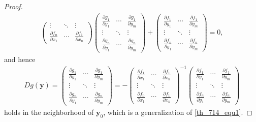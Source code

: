 \documentclass[10pt]{book}
\theoremstyle{definition}
\numberwithin{equation}{chapter}
\begin{document}
\begin{proof}
\begin{align*}
\begin{pmatrix}
        \vdots & \ddots & \vdots \\
        \frac{\partial f_n}{\partial x_1} & \cdots & \frac{\partial f_1}{\partial x_n}
    \end{pmatrix} 
    \begin{pmatrix}
        \frac{\partial g_1}{\partial y_1} & \cdots & \frac{\partial g_1}{\partial y_m} \\
        \vdots & \ddots & \vdots \\
        \frac{\partial g_n}{\partial y_1} & \cdots & \frac{\partial g_n}{\partial y_m}
    \end{pmatrix} + 
    \begin{pmatrix}
        \frac{\partial f_1}{\partial y_1} & \cdots & \frac{\partial f_1}{\partial y_m} \\
        \vdots & \ddots & \vdots \\
        \frac{\partial f_n}{\partial y_1} & \cdots & \frac{\partial f_n}{\partial y_m}
    \end{pmatrix} = 0,
\end{align*}
and hence
\begin{align*}
    Dg(\mathbf{y}) = \begin{pmatrix}
        \frac{\partial g_1}{\partial y_1} & \cdots & \frac{\partial g_1}{\partial y_m} \\
        \vdots & \ddots & \vdots \\
        \frac{\partial g_n}{\partial y_1} & \cdots & \frac{\partial g_n}{\partial y_m}
    \end{pmatrix} = - \begin{pmatrix}
        \frac{\partial f_1}{\partial x_1} & \cdots & \frac{\partial f_1}{\partial x_n} \\
        \vdots & \ddots & \vdots \\
        \frac{\partial f_n}{\partial x_1} & \cdots & \frac{\partial f_1}{\partial x_n}
    \end{pmatrix}^{-1} \begin{pmatrix}
        \frac{\partial f_1}{\partial y_1} & \cdots & \frac{\partial f_1}{\partial y_m} \\
        \vdots & \ddots & \vdots \\
        \frac{\partial f_n}{\partial y_1} & \cdots & \frac{\partial f_n}{\partial y_m}
    \end{pmatrix}
\end{align*}
holds in the neighborhood of $\mathbf{y}_0$, which is a generalization of \eqref{th_714_equ1}.
\end{proof}
























\newpage


\end{document}
